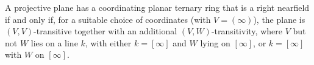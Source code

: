 A projective plane has a coordinating planar ternary ring that is a right nearfield if and only if, for a suitable choice of coordinates (with $V = (\infty)$), the plane is $(V,V)$-transitive together with an additional $(V,W)$-transitivity, where $V$ but not $W$ lies on a line $k$, with either $k = [\infty]$ and $W$ lying on $[\infty]$, or $k = [\infty]$ with $W$ on $[\infty]$.
